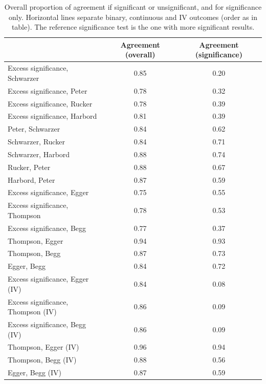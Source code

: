 \documentclass[11pt,a4paper,twoside]{book}\usepackage[]{graphicx}\usepackage[]{color}
\begin{document}
\begin{table}[ht]
\centering
\begingroup\scriptsize
\begin{tabular}{lcc}
  \hline
 & Agreement (overall) & Agreement (significance) \\ 
  \hline
Excess significance, Schwarzer & 0.85 & 0.20 \\ 
  Excess significance, Peter & 0.78 & 0.32 \\ 
  Excess significance, Rucker & 0.78 & 0.39 \\ 
  Excess significance, Harbord & 0.81 & 0.39 \\ 
  Peter, Schwarzer & 0.84 & 0.62 \\ 
  Schwarzer, Rucker & 0.84 & 0.71 \\ 
  Schwarzer, Harbord & 0.88 & 0.74 \\ 
  Rucker, Peter & 0.88 & 0.67 \\ 
  Harbord, Peter & 0.87 & 0.59 \\ 
  Excess significance, Egger & 0.75 & 0.55 \\ 
  Excess significance, Thompson & 0.78 & 0.53 \\ 
  Excess significance, Begg & 0.77 & 0.37 \\ 
  Thompson, Egger & 0.94 & 0.93 \\ 
  Thompson, Begg & 0.87 & 0.73 \\ 
  Egger, Begg & 0.84 & 0.72 \\ 
  Excess significance, Egger (IV) & 0.84 & 0.08 \\ 
  Excess significance, Thompson (IV) & 0.86 & 0.09 \\ 
  Excess significance, Begg (IV) & 0.86 & 0.09 \\ 
  Thompson, Egger (IV) & 0.96 & 0.94 \\ 
  Thompson, Begg (IV) & 0.88 & 0.56 \\ 
  Egger, Begg (IV) & 0.87 & 0.59 \\ 
   \hline
\end{tabular}
\endgroup
\caption{Overall proportion of agreement if significant or unsignificant, and for significance only. Horizontal lines separate binary, continuous and IV outcomes (order as in table). The reference significance test is the one with more significant results.} 
\label{test.agreement}
\end{table}
\end{document}
